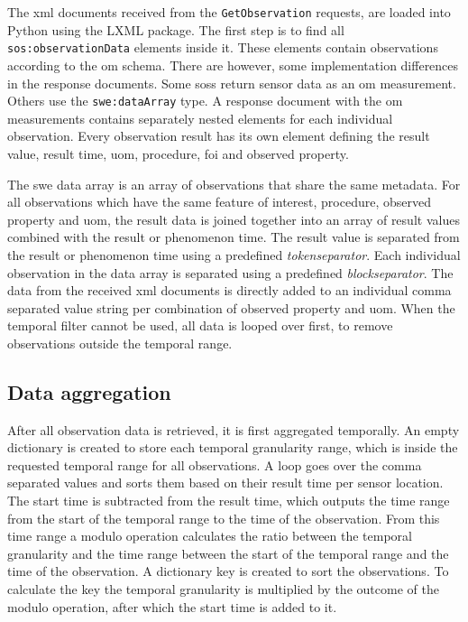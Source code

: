 \begin{sloppypar}
The \ac{xml} documents received from the \texttt{GetObservation} requests, are loaded into Python using the LXML package. The first step is to find all \texttt{sos:observationData} elements inside it. These elements contain observations according to the \ac{om} schema. There are however, some implementation differences in the response documents. Some \aclp{sos} return sensor data as an \ac{om} measurement. Others use the \texttt{swe:dataArray} type. A response document with the \ac{om} measurements contains separately nested elements for each individual observation. Every observation result has its own element defining the result value, result time, \ac{uom}, procedure, \ac{foi} and observed property.  
\end{sloppypar}

The \ac{swe} data array is an array of observations that share the same metadata. For all observations which have the same feature of interest, procedure, observed property and \ac{uom}, the result data is joined together into an array of result values combined with the result or phenomenon time. The result value is separated from the result or phenomenon time using a predefined \textit{tokenseparator}. Each individual observation in the data array is separated using a predefined \textit{blockseparator}. The data from the received \ac{xml} documents is directly added to an individual comma separated value string per combination of observed property and \ac{uom}. When the temporal filter cannot be used, all data is looped over first, to remove observations outside the temporal range. 

\subsection{Data aggregation}
After all observation data is retrieved, it is first aggregated temporally. An empty dictionary is created to store each temporal granularity range, which is inside the requested temporal range for all observations. A loop goes over the comma separated values and sorts them based on their result time per sensor location. The start time is subtracted from the result time, which outputs the time range from the start of the temporal range to the time of the observation. From this time range a modulo operation calculates the ratio between the temporal granularity and the time range between the start of the temporal range and the time of the observation. A dictionary key is created to sort the observations. To calculate the key the temporal granularity is multiplied by the outcome of the modulo operation, after which the start time is added to it. 

